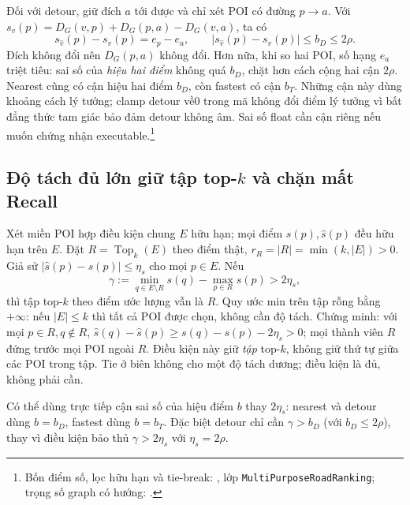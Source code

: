 Đối với detour, giữ đích $a$ tới được và chỉ xét POI có đường $p\to a$.
Với $s_v(p)=D_G(v,p)+D_G(p,a)-D_G(v,a)$, ta có
\begin{equation}
 s_{\hat v}(p)-s_v(p)=e_p-e_a,\qquad
 |s_{\hat v}(p)-s_v(p)|\leq b_D\leq2\rho.
 \label{eq:formal-ranking-detour-error}
\end{equation}
Đích không đổi nên $D_G(p,a)$ không đổi. Hơn nữa, khi so hai POI, số
hạng $e_a$ triệt tiêu: sai số của \emph{hiệu hai điểm} không quá $b_D$,
chặt hơn cách cộng hai cận $2\rho$. Nearest cũng có cận hiệu hai điểm
$b_D$, còn fastest có cận $b_T$. Những cận này dùng khoảng cách lý
tưởng; clamp detour về0 trong mã không đổi điểm lý tưởng vì bất đẳng
thức tam giác bảo đảm detour không âm. Sai số float cần cận riêng nếu
muốn chứng nhận executable.\footnote{Bốn điểm số, lọc hữu hạn và
tie-break: , lớp
\texttt{MultiPurposeRoadRanking}; trọng số graph có hướng:
.}

\subsection{Độ tách đủ lớn giữ tập top-$k$ và chặn mất Recall}
\label{sec:formal-ranking-gap}

Xét miền POI hợp điều kiện chung $E$ hữu hạn; mọi điểm $s(p),\hat s(p)$
đều hữu hạn trên $E$. Đặt $R=\operatorname{Top}_k(E)$ theo điểm thật,
$r_R=|R|=\min(k,|E|)>0$. Giả sử
$|\hat s(p)-s(p)|\leq\eta_s$ cho mọi $p\in E$. Nếu
\begin{equation}
 \gamma:=\min_{q\in E\setminus R}s(q)-\max_{p\in R}s(p)
 >2\eta_s,
 \label{eq:formal-ranking-gap-condition}
\end{equation}
thì tập top-$k$ theo điểm ước lượng vẫn là $R$. Quy ước min trên tập
rỗng bằng $+\infty$: nếu $|E|\leq k$ thì tất cả POI được chọn, không
cần độ tách. Chứng minh: với mọi $p\in R,q\notin R$,
$\hat s(q)-\hat s(p)\geq s(q)-s(p)-2\eta_s>0$; mọi thành viên $R$
đứng trước mọi POI ngoài $R$. Điều kiện này giữ \emph{tập} top-$k$,
không giữ thứ tự giữa các POI trong tập. Tie ở biên không cho một độ
tách dương; điều kiện là đủ, không phải cần.

Có thể dùng trực tiếp cận sai số của hiệu điểm $b$ thay $2\eta_s$:
nearest và detour dùng $b=b_D$, fastest dùng $b=b_T$. Đặc biệt detour
chỉ cần $\gamma>b_D$ (với $b_D\leq2\rho$), thay vì điều kiện bảo thủ
$\gamma>2\eta_s$ với $\eta_s=2\rho$.

